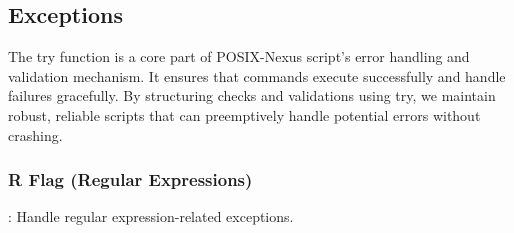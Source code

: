 \subsection{Exceptions}
\label{sec:component:sub:exception}
The try function is a core part of POSIX-Nexus script's error handling and validation mechanism.
It ensures that commands execute successfully and handle failures gracefully.
By structuring checks and validations using try, we maintain robust, reliable scripts that can preemptively handle potential errors without crashing.

\subsubsection{R Flag (Regular Expressions)}
\label{sec:component:sub:exception:sub:R}
: Handle regular expression-related exceptions.
